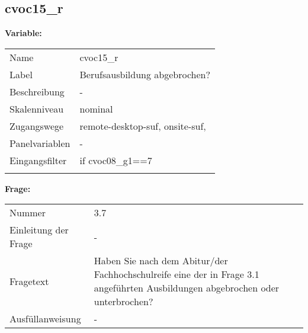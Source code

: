 	
	
	\subsection{cvoc15\_r}
	\label{subSection:cvoc15_r}

	\noindent\textbf{Variable:}\\
		\begin{tabular}{lL{11.3cm}}
			\label{tableVariable:cvoc15_r}
			Name & cvoc15\_r \\
			Label & Berufsausbildung abgebrochen? \\
			Beschreibung & - \\
			Skalenniveau & nominal \\
			Zugangswege &
				remote-desktop-suf,
				onsite-suf,
 \\
			Panelvariablen & -
			 \\
			Eingangsfilter & if cvoc08\_g1==7 \\
 \\
		\end{tabular}

		\vspace*{1 cm}
		\noindent\textbf{Frage:}\\
		\begin{tabular}{lL{11.3cm}}
			\label{tableQuestion:cvoc15_r}
			Nummer & 3.7 \\
			Einleitung der Frage & - \\
			Fragetext & Haben Sie nach dem Abitur/der Fachhochschulreife eine der in Frage 3.1 angeführten Ausbildungen abgebrochen oder unterbrochen? \\
			Ausfüllanweisung & - \\
		\end{tabular}





